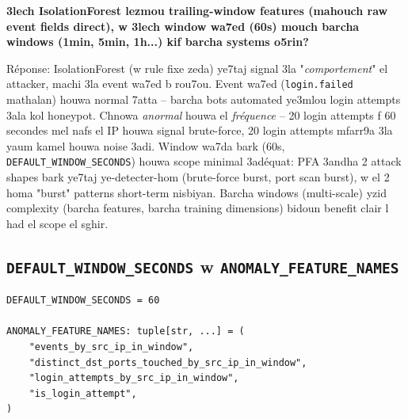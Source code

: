 \documentclass[11pt,a4paper]{report}
\DeclareRobustCommand{\code}[1]{\texttt{#1}}
\begin{document}
\begin{soual}
\textbf{3lech IsolationForest lezmou trailing-window features (mahouch
raw event fields direct), w 3lech window wa7ed (60s) mouch barcha windows
(1min, 5min, 1h...) kif barcha systems o5rin?}

Réponse: IsolationForest (w rule fixe zeda) ye7taj signal 3la "\emph{comportement}"
el attacker, machi 3la event wa7ed b rou7ou. Event wa7ed (\code{login.failed}
mathalan) houwa normal 7atta -- barcha bots automated ye3mlou login attempts
3ala kol honeypot. Chnowa \emph{anormal} houwa el \emph{fréquence} -- 20
login attempts f 60 secondes mel nafs el IP houwa signal brute-force, 20
login attempts mfarr9a 3la yaum kamel houwa noise 3adi. Window wa7da bark
(60s, \code{DEFAULT\_WINDOW\_SECONDS}) houwa scope minimal 3adéquat: PFA
3andha 2 attack shapes bark ye7taj ye-detecter-hom (brute-force burst,
port scan burst), w el 2 homa "burst" patterns short-term nisbiyan. Barcha
windows (multi-scale) yzid complexity (barcha features, barcha training
dimensions) bidoun benefit clair l had el scope el sghir.
\end{soual}

\subsection{\code{DEFAULT\_WINDOW\_SECONDS} w \code{ANOMALY\_FEATURE\_NAMES}}

\begin{lstlisting}[style=pystyle]
DEFAULT_WINDOW_SECONDS = 60

ANOMALY_FEATURE_NAMES: tuple[str, ...] = (
    "events_by_src_ip_in_window",
    "distinct_dst_ports_touched_by_src_ip_in_window",
    "login_attempts_by_src_ip_in_window",
    "is_login_attempt",
)
\end{lstlisting}
\end{document}
